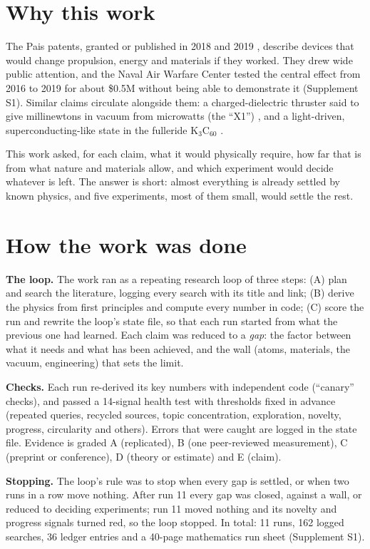 \documentclass[10.5pt,a4paper]{article}
\newcommand{\Kc}{K$_3$C$_{60}$}
\begin{document}
\section{Why this work}
The Pais patents, granted or published in 2018 and 2019 \cite{p532,p366,p827,p733,p597}, describe devices that would change propulsion, energy and materials if they worked. They drew wide public attention, and the Naval Air Warfare Center tested the central effect from 2016 to 2019 for about \$0.5M without being able to demonstrate it (Supplement S1). Similar claims circulate alongside them: a charged-dielectric thruster said to give millinewtons in vacuum from microwatts (the ``X1'') \cite{exodus}, and a light-driven, superconducting-like state in the fulleride \Kc{} \cite{mitrano}.

This work asked, for each claim, what it would physically require, how far that is from what nature and materials allow, and which experiment would decide whatever is left. The answer is short: almost everything is already settled by known physics, and five experiments, most of them small, would settle the rest.

\section{How the work was done}
\textbf{The loop.} The work ran as a repeating research loop of three steps: (A) plan and search the literature, logging every search with its title and link; (B) derive the physics from first principles and compute every number in code; (C) score the run and rewrite the loop's state file, so that each run started from what the previous one had learned. Each claim was reduced to a \emph{gap}: the factor between what it needs and what has been achieved, and the wall (atoms, materials, the vacuum, engineering) that sets the limit.

\textbf{Checks.} Each run re-derived its key numbers with independent code (``canary'' checks), and passed a 14-signal health test with thresholds fixed in advance (repeated queries, recycled sources, topic concentration, exploration, novelty, progress, circularity and others). Errors that were caught are logged in the state file. Evidence is graded A (replicated), B (one peer-reviewed measurement), C (preprint or conference), D (theory or estimate) and E (claim).

\textbf{Stopping.} The loop's rule was to stop when every gap is settled, or when two runs in a row move nothing. After run 11 every gap was closed, against a wall, or reduced to deciding experiments; run 11 moved nothing and its novelty and progress signals turned red, so the loop stopped. In total: 11 runs, 162 logged searches, 36 ledger entries and a 40-page mathematics run sheet (Supplement S1).
\end{document}
